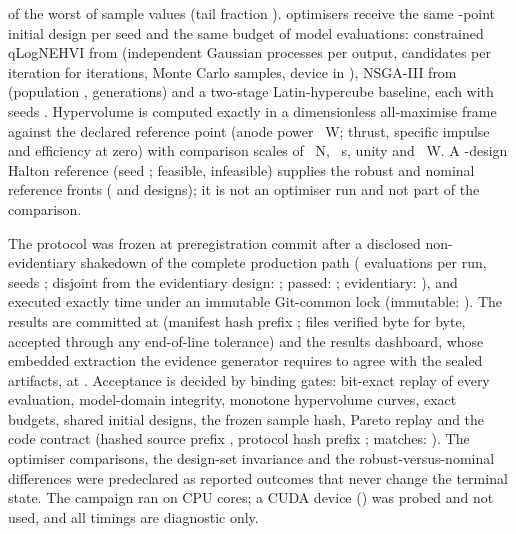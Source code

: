 \MdoRiskMeasure{} of the worst \MdoTailCount{} of \MdoSampleCount{} sample values
(tail fraction \MdoTailFraction). \MdoStrategyCount{} optimisers receive the same
\MdoInitialDesign-point initial design per seed and the same budget of
\MdoEvaluationsPerRun{} model evaluations: constrained qLogNEHVI from
\MdoBoLibrary{} \MdoBotorchVersion{} (independent Gaussian processes per output,
\MdoBoBatch{} candidates per iteration for \MdoBoIterations{} iterations,
\MdoBoMcSamples{} Monte Carlo samples, device \texttt{\MdoBoDevice} in
\texttt{\MdoBoDtype}), NSGA-III from \MdoNsgaLibrary{} \MdoPymooVersion{}
(population \MdoNsgaPopulation, \MdoNsgaGenerations{} generations) and a two-stage
Latin-hypercube baseline, each with seeds \MdoSeeds. Hypervolume is computed exactly
in a dimensionless all-maximise frame against the declared reference point (anode
power \MdoRefAnodePowerW{}~W; thrust, specific impulse and efficiency at zero) with
comparison scales of \MdoScaleThrust{}~N, \MdoScaleIsp{}~s, unity and
\MdoScalePower{}~W. A \MdoDenseCount-design Halton reference (seed \MdoDenseSeed;
\MdoDenseFeasible{} feasible, \MdoDenseInfeasible{} infeasible) supplies the robust
and nominal reference fronts (\MdoDenseRobustFront{} and \MdoDenseNominalFront{}
designs); it is not an optimiser run and not part of the comparison.

The protocol was frozen at preregistration commit \texttt{\MdoPreregCommit} after a
disclosed non-evidentiary shakedown of the complete production path
(\MdoShakedownBudget{} evaluations per run, seeds \MdoShakedownSeeds; disjoint from
the evidentiary design: \MdoShakedownDisjoint; passed: \MdoShakedownPassed;
evidentiary: \MdoShakedownEvidentiary), and executed exactly \MdoAttemptCount{} time
under an immutable Git-common lock (immutable: \MdoLockImmutable). The results are
committed at \texttt{\MdoResultsCommit} (manifest hash prefix
\texttt{\MdoManifestSha}; \MdoVerifiedFiles{} files verified byte for byte,
\MdoToleratedEolFiles{} accepted through any end-of-line tolerance) and the results
dashboard, whose embedded extraction the evidence generator requires to agree with
the sealed artifacts, at \texttt{\MdoDashboardCommit}. Acceptance is decided by
\MdoGateCount{} binding gates: bit-exact replay of every evaluation, model-domain
integrity, monotone hypervolume curves, exact budgets, shared initial designs, the
frozen sample hash, Pareto replay and the code contract (hashed source prefix
\texttt{\MdoSourceSha}, protocol hash prefix \texttt{\MdoProtocolSha}; matches:
\MdoCodeContractMatches). The optimiser comparisons, the design-set invariance and
the robust-versus-nominal differences were predeclared as reported outcomes that
never change the terminal state. The campaign ran on \MdoCpuCount{} CPU cores; a
CUDA device (\MdoCudaDevice) was probed and not used, and all timings are
diagnostic only.

